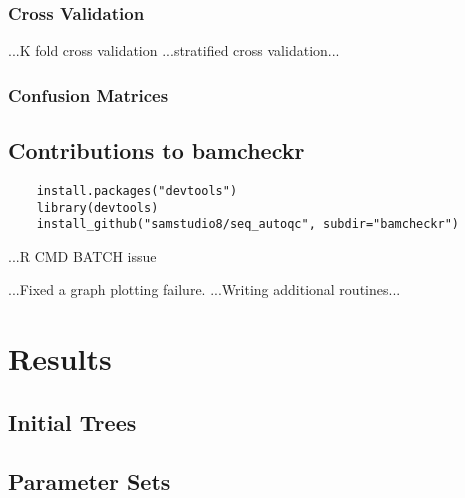\subsubsection{Cross Validation}
...K fold cross validation
...stratified cross validation...

\subsubsection{Confusion Matrices}

\subsection{Contributions to bamcheckr}
\begin{verbatim}
    install.packages("devtools")
    library(devtools)
    install_github("samstudio8/seq_autoqc", subdir="bamcheckr")
\end{verbatim}

...R CMD BATCH issue

...Fixed a graph plotting failure.
...Writing additional routines...

\section{Results}
\subsection{Initial Trees}
\subsection{Parameter Sets}
